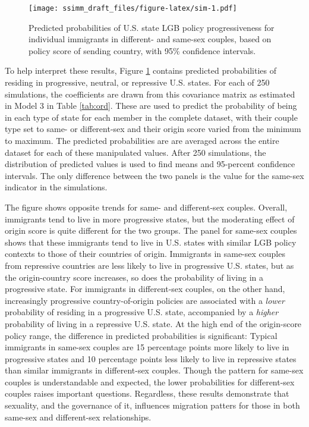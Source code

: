 \documentclass[
  11pt,
]{article}
\begin{document}
\begin{figure}
\centering
\texttt{[image: ssimm\_draft\_files/figure-latex/sim-1.pdf]}
\caption{\label{fig:sim}Predicted probabilities of U.S. state LGB policy progressiveness for individual immigrants in different- and same-sex couples, based on policy score of sending country, with 95\% confidence intervals.}
\end{figure}

To help interpret these results, Figure \ref{fig:sim} contains predicted probabilities of residing in progressive, neutral, or repressive U.S. states. For each of 250 simulations, the coefficients are drawn from this covariance matrix as estimated in Model 3 in Table \ref{tab:ord}. These are used to predict the probability of being in each type of state for each member in the complete dataset, with their couple type set to same- or different-sex and their origin score varied from the minimum to maximum. The predicted probabilities are are averaged across the entire dataset for each of these manipulated values. After 250 simulations, the distribution of predicted values is used to find means and 95-percent confidence intervals. The only difference between the two panels is the value for the same-sex indicator in the simulations.

The figure shows opposite trends for same- and different-sex couples. Overall, immigrants tend to live in more progressive states, but the moderating effect of origin score is quite different for the two groups. The panel for same-sex couples shows that these immigrants tend to live in U.S. states with similar LGB policy contexts to those of their countries of origin. Immigrants in same-sex couples from repressive countries are less likely to live in progressive U.S. states, but as the origin-country score increases, so does the probability of living in a progressive state. For immigrants in different-sex couples, on the other hand, increasingly progressive country-of-origin policies are associated with a \emph{lower} probability of residing in a progressive U.S. state, accompanied by a \emph{higher} probability of living in a repressive U.S. state. At the high end of the origin-score policy range, the difference in predicted probabilities is significant: Typical immigrants in same-sex couples are 15 percentage points more likely to live in progressive states and 10 percentage points less likely to live in repressive states than similar immigrants in different-sex couples. Though the pattern for same-sex couples is understandable and expected, the lower probabilities for different-sex couples raises important questions. Regardless, these results demonstrate that sexuality, and the governance of it, influences migration patters for those in both same-sex and different-sex relationships.
\end{document}
